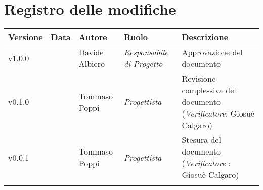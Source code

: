 \section*{\hfil Registro delle modifiche \hfil}
{
	\newlength{\freewidth}
	\setlength{\freewidth}{\dimexpr\textwidth-10\tabcolsep}
	\renewcommand{\arraystretch}{1.5}
	\centering
	\setlength{\aboverulesep}{0pt}
	\setlength{\belowrulesep}{0pt}
	\begin{longtable}{C{.131777\freewidth} C{.134036\freewidth} C{.263554\freewidth} C{.188254\freewidth} C{.282379\freewidth}}
		\toprule 
		\textbf{Versione} & \textbf{Data} & \textbf{Autore} & \textbf{Ruolo} & \textbf{Descrizione}\\
		\toprule
		\endhead
		
		v1.0.0 & \DataDoc{} &Davide Albiero &  \textit{Responsabile di Progetto} & Approvazione del documento \\  
		v0.1.0 & \DataDoc{} & Tommaso Poppi &  \textit{Progettista} & Revisione complessiva del documento (\textit{Verificatore}: Giosuè Calgaro) \\ 
		v0.0.1 & \DataDoc{} & Tommaso Poppi &  \textit{Progettista} & Stesura del documento (\textit{Verificatore} : Giosuè Calgaro) \\
		
		
		\bottomrule
		\hiderowcolors
	\end{longtable}
}
